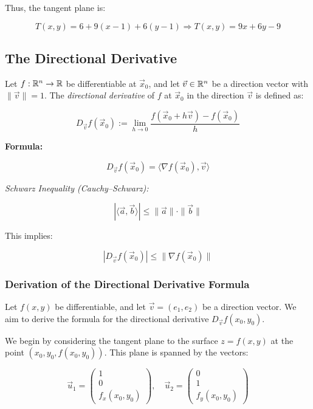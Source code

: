 Thus, the tangent plane is:

\[
    T(x, y) = 6 + 9(x - 1) + 6(y - 1)
    \Rightarrow T(x, y) = 9x + 6y - 9
\]

\subsection{The Directional Derivative}

Let \( f : \mathbb{R}^n \to \mathbb{R} \) be differentiable at \( \vec{x}_0 \), 
and let \( \vec{v} \in \mathbb{R}^n \) be a direction vector with \( \|\vec{v}\| = 1 \). The 
\emph{directional derivative} of \( f \) at \( \vec{x}_0 \) in the direction \( \vec{v} \) is defined as:

\[
    D_{\vec{v}}f(\vec{x}_0) := \lim_{h \to 0} \frac{f(\vec{x}_0 + h\vec{v}) - f(\vec{x}_0)}{h}
\]

\textbf{Formula:}

\[
    D_{\vec{v}}f(\vec{x}_0) = \langle \nabla f(\vec{x}_0), \vec{v} \rangle
\]

\emph{Schwarz Inequality (Cauchy–Schwarz):}

\[
    |\langle \vec{a}, \vec{b} \rangle| \le \|\vec{a}\| \cdot \|\vec{b}\|
\]

This implies:

\[
    |D_{\vec{v}}f(\vec{x}_0)| \le \|\nabla f(\vec{x}_0)\|
\]

\subsubsection{Derivation of the Directional Derivative Formula}

Let \( f(x, y) \) be differentiable, and let \( \vec{v} = (e_1, e_2) \) be a direction vector. We aim to 
derive the formula for the directional derivative \( D_{\vec{v}} f(x_0, y_0) \).

We begin by considering the tangent plane to the surface \( z = f(x, y) \) at the point 
\( (x_0, y_0, f(x_0, y_0)) \). This plane is spanned by the vectors:

\[
    \vec{u}_1 = 
    \begin{pmatrix}
    1 \\
    0 \\
    f_x(x_0, y_0)
    \end{pmatrix}, \quad
    \vec{u}_2 = 
    \begin{pmatrix}
    0 \\
    1 \\
    f_y(x_0, y_0)
    \end{pmatrix}
\]

